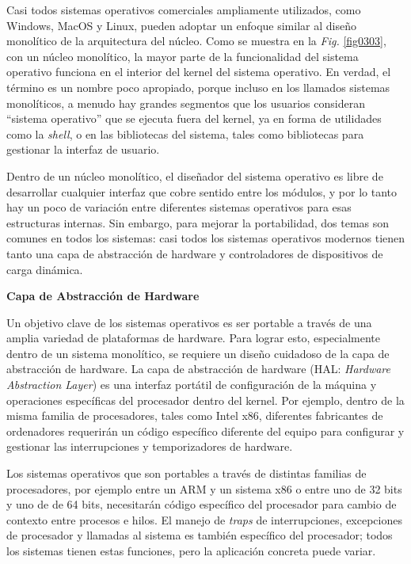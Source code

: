 \documentclass[10pt]{book}
\begin{document}
Casi todos sistemas operativos comerciales ampliamente utilizados, como Windows, MacOS y Linux, pueden adoptar un enfoque similar al diseño monolítico de  la arquitectura del núcleo. Como se muestra en la \textit{Fig.} \ref{fig0303}, con un núcleo monolítico, la mayor parte de la funcionalidad del sistema operativo funciona en el interior del kernel del sistema operativo. En verdad, el término es un nombre poco apropiado, porque incluso en los llamados sistemas monolíticos, a menudo hay grandes segmentos que los usuarios consideran ``sistema operativo'' que se ejecuta fuera del kernel, ya en forma de utilidades como la \textit{shell}, o en las bibliotecas del sistema, tales como bibliotecas para gestionar la interfaz de usuario.

Dentro de un núcleo monolítico, el diseñador del sistema operativo es libre de desarrollar cualquier interfaz que cobre sentido entre los módulos, y por lo tanto hay un poco de variación entre diferentes sistemas operativos para esas estructuras internas. Sin embargo, para mejorar la portabilidad, dos temas son comunes en todos los sistemas: casi todos los sistemas operativos modernos tienen tanto una capa de abstracción de hardware y controladores de dispositivos de carga dinámica.

\textbf{Capa de Abstracción de Hardware}

Un objetivo clave de los sistemas operativos es ser portable a través de una amplia variedad de plataformas de hardware. Para lograr esto, especialmente dentro de un sistema monolítico, se requiere un diseño cuidadoso de la capa de abstracción de hardware. La capa de abstracción de hardware (HAL: \textit{\textit{Hardware Abstraction Layer}}) es una interfaz portátil de configuración de la máquina y operaciones específicas del procesador dentro del kernel. Por ejemplo, dentro de la misma familia de procesadores, tales como Intel {\mf x86}, diferentes fabricantes de ordenadores requerirán un código específico diferente del equipo para configurar y gestionar las interrupciones y temporizadores de hardware.

Los sistemas operativos que son portables a través de distintas familias de procesadores, por ejemplo entre un ARM y un sistema {\mf x86} o entre uno de 32 bits y uno de de 64 bits, necesitarán código específico del procesador para cambio de contexto entre procesos e hilos. El manejo de \textit{traps} de interrupciones, excepciones de procesador y llamadas al sistema es también específico del procesador; todos los sistemas tienen estas funciones, pero la aplicación concreta puede variar.
\end{document}
